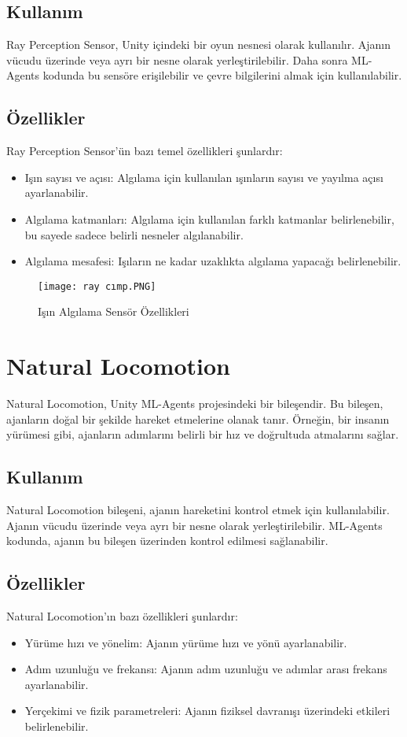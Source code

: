 \documentclass{article}
\begin{document}
\subsection{Kullanım}
Ray Perception Sensor, Unity içindeki bir oyun nesnesi olarak kullanılır. Ajanın vücudu üzerinde veya ayrı bir nesne olarak yerleştirilebilir. Daha sonra ML-Agents kodunda bu sensöre erişilebilir ve çevre bilgilerini almak için kullanılabilir.

\subsection{Özellikler}
Ray Perception Sensor'ün bazı temel özellikleri şunlardır:
\begin{itemize}
\item Işın sayısı ve açısı: Algılama için kullanılan ışınların sayısı ve yayılma açısı ayarlanabilir.
\item Algılama katmanları: Algılama için kullanılan farklı katmanlar belirlenebilir, bu sayede sadece belirli nesneler algılanabilir.
\item Algılama mesafesi: Işıların ne kadar uzaklıkta algılama yapacağı belirlenebilir.
\end{itemize}
\begin{figure}[h]
    \centering
    \texttt{[image: ray cımp.PNG]}
    \caption{Işın Algılama Sensör Özellikleri}
    \label{fig:resim21}
    \end{figure}

\section{Natural Locomotion}
Natural Locomotion, Unity ML-Agents projesindeki bir bileşendir. Bu bileşen, ajanların doğal bir şekilde hareket etmelerine olanak tanır. Örneğin, bir insanın yürümesi gibi, ajanların adımlarını belirli bir hız ve doğrultuda atmalarını sağlar.

\subsection{Kullanım}
Natural Locomotion bileşeni, ajanın hareketini kontrol etmek için kullanılabilir. Ajanın vücudu üzerinde veya ayrı bir nesne olarak yerleştirilebilir. ML-Agents kodunda, ajanın bu bileşen üzerinden kontrol edilmesi sağlanabilir.

\subsection{Özellikler}
Natural Locomotion'ın bazı özellikleri şunlardır:
\begin{itemize}
\item Yürüme hızı ve yönelim: Ajanın yürüme hızı ve yönü ayarlanabilir.
\item Adım uzunluğu ve frekansı: Ajanın adım uzunluğu ve adımlar arası frekans ayarlanabilir.
\item Yerçekimi ve fizik parametreleri: Ajanın fiziksel davranışı üzerindeki etkileri belirlenebilir.
\end{itemize}
\end{document}
